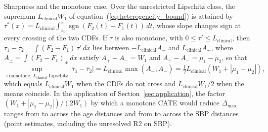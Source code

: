 \documentclass[AMA,Times1COL]{WileyNJDv5}
\begin{document}
Sharpness and the monotone case. Over the unrestricted Lipschitz class, the supremum $L_{\text{clinical}} W_1$ of equation~(\ref{eq:heterogeneity_bound}) is attained by $\tau^*(x) = L_{\text{clinical}} \int_{x_0}^{x} \operatorname{sgn}(F_2(t) - F_1(t))\,dt$, whose slope changes sign at every crossing of the two CDFs. If $\tau$ is also monotone, with $0 \leq \tau' \leq L_{\text{clinical}}$, then $\bar{\tau}_1 - \bar{\tau}_2 = \int (F_2 - F_1)\,\tau'\,dx$ lies between $-L_{\text{clinical}} A_-$ and $L_{\text{clinical}} A_+$, where $A_\pm = \int (F_2 - F_1)_\pm\,dx$ satisfy $A_+ + A_- = W_1$ and $A_+ - A_- = \mu_1 - \mu_2$, so that
\begin{equation}
\sup_{\tau\ \text{monotone},\ L_{\text{clinical}}\text{-Lipschitz}} |\bar{\tau}_1 - \bar{\tau}_2| = L_{\text{clinical}} \max(A_+, A_-) = \tfrac{1}{2} L_{\text{clinical}} \left( W_1 + |\mu_1 - \mu_2| \right),
\label{eq:mono_bound}
\end{equation}
which equals $L_{\text{clinical}} W_1$ when the CDFs do not cross and $L_{\text{clinical}} W_1 / 2$ when the means coincide. In the application of Section~\ref{sec:application}, the factor $(W_1 + |\mu_1 - \mu_2|)/(2 W_1)$ by which a monotone CATE would reduce $\Delta_{\max}$ ranges from  to  across the age distances and from  to  across the SBP distances (point estimates, including the unresolved R2 on SBP).

\end{document}
